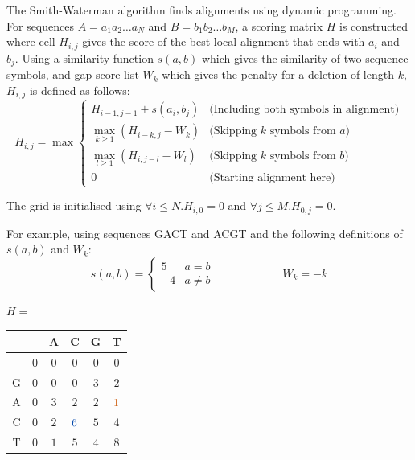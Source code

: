 The Smith-Waterman algorithm \cite{SW_Original} finds alignments using dynamic programming.
For sequences $A=a_1 a_2 \ldots a_N$ and $B=b_1 b_2 \ldots b_M$, a scoring matrix $H$ is constructed where cell $H_{i,j}$ gives the score of the best local alignment that ends with $a_i$ and $b_j$.
Using a similarity function $s(a,b)$ which gives the similarity of two sequence symbols, and gap score list $W_k$ which gives the penalty for a deletion of length $k$, $H_{i,j}$ is defined as follows:
$$ H_{i,j} = \max \begin{cases}
H_{i-1,j-1} + s(a_i, b_j) & \text{(Including both symbols in alignment)} \\
\max_{k \geq 1}(H_{i-k,j} - W_k) & \text{(Skipping $k$ symbols from $a$)} \\
\max_{l \geq 1}(H_{i,j-l} - W_l) & \text{(Skipping $k$ symbols from $b$)} \\
0 & \text{(Starting alignment here)}
\end{cases}$$

The grid is initialised using $\forall i\leq N . H_{i,0}=0$ and $\forall j \leq M . H_{0,j}=0$.

For example, using sequences {\ttfamily GACT} and {\ttfamily ACGT} and the following definitions of $s(a,b)$ and $W_k$:
$$s(a, b)= \begin{cases}
5 &  a = b \\
-4 & a \neq b
\end{cases}
\qquad \qquad \qquad W_k = -k
$$

\begin{center}
$H = $ \begin{tabular}{|c|ccccc|} \hline
& & {\ttfamily A} & {\ttfamily C} & {\ttfamily G} & {\ttfamily T} \\ \hline
& $0$ & $0$ & $0$ & $0$ & $0$ \\
{\ttfamily G} & $0$ & $0$ & $0$ & $3$ & $2$ \\
{\ttfamily A} & $0$ & $3$ & $2$ & $2$ & ${\color{darkorange} 1}$ \\
{\ttfamily C} & $0$ & $2$ & ${\color{darkblue}6}$ & $5$ & $4$ \\
{\ttfamily T} & $0$ & $1$ & $5$ & $4$ & $8$ \\ \hline
\end{tabular}
\end{center}

